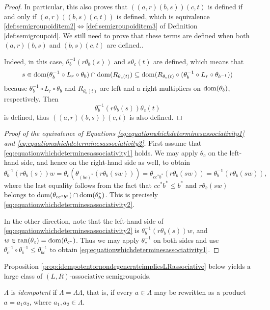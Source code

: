 \begin{proof}
In particular, this also proves that $((a,r)(b,s))(c,t)$ is defined if and only if $(a,r)((b,s)(c,t))$ is defined, which is equivalence \ref{def:semigroupoiditem2}$\iff$\ref{def:semigroupoiditem3} of Definition \ref{def:semigroupoid}. We still need to prove that these terms are defined when both $(a,r)(b,s)$ and $(b,s)(c,t)$ are defined..

Indeed, in this case, $\theta_b^{-1}(r\theta_b(s))$ and $s\theta_c(t)$ are defined, which means that
\[s\in\operatorname{dom}(\theta_b^{-1}\circ L_r\circ\theta_b)\cap\operatorname{dom}(R_{\theta_c(t)})\subseteq\operatorname{dom}(R_{\theta_c(t)}\circ(\theta_b^{-1}\circ  L_r\circ\theta_{b^{-1}}))\]
because $\theta_b^{-1}\circ L_r\circ\theta_b$ and $R_{\theta_c(t)}$ are left and a right multipliers on $\operatorname{dom}(\theta_b)$, respectively. Then
\[\theta_b^{-1}(r\theta_b(s))\theta_c(t)\]
is defined, thus $((a,r)(b,s))(c,t)$ is also defined.\qedhere
\end{proof}

\begin{proof}[Proof of the equivalence of Equations \eqref{eq:equationwhichdeterminesassociativity1} and \eqref{eq:equationwhichdeterminesassociativity2}]
First assume that \eqref{eq:equationwhichdeterminesassociativity1} holds. We may apply $\theta_c$ on the left-hand side, and hence on the right-hand side as well, to obtain
\[\theta_b^{-1}(r\theta_b(s))w=\theta_c(\theta_{(bc)^*}(r\theta_b(sw)))=\theta_{cc^*b^*}(r\theta_b(sw))=\theta_b^{-1}(r\theta_b(sw)),\]
where the last equality follows from the fact that $cc^*b^*\leq b^*$ and $r\theta_b(sw)$ belongs to $\operatorname{dom}(\theta_{cc^*b^*})\cap\operatorname{dom}(\theta_b^*)$. This is precisely \eqref{eq:equationwhichdeterminesassociativity2}.

In the other direction, note that the left-hand side of \eqref{eq:equationwhichdeterminesassociativity2} is $\theta_b^{-1}(r\theta_b(s))w$, and $w\in\operatorname{ran}(\theta_c)=\operatorname{dom}(\theta_{c^*})$. Thus we may apply $\theta_c^{-1}$ on both sides and use $\theta_c^{-1}\circ\theta_b^{-1}\leq\theta_{bc}^{-1}$ to obtain \eqref{eq:equationwhichdeterminesassociativity1}.\qedhere
\end{proof}

Proposition \ref{prop:idempotentornondegenerateimpliesLRassociative} below yields a large class of $(L,R)$-associative semigroupoids.

\begin{definition}\label{def:idempotentsemigroupoid}
	$\Lambda$ is \emph{idempotent} if $\Lambda=\Lambda\Lambda$, that is, if every $a\in\Lambda$ may be rewritten as a product $a=a_1a_2$, where $a_1,a_2\in\Lambda$.
\end{definition}


